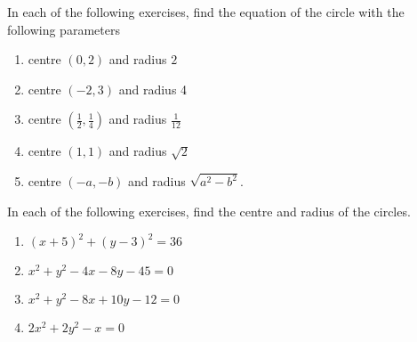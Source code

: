 In each of the following exercises, find the equation of the circle with the following parameters
\begin{enumerate}[label=\thesection.\arabic*,ref=\thesection.\theenumi]
 \item centre $(0,2)$ and radius $2$
	 \\
		\solution
\label{chapters/11/11/1/1}

%
  \item centre $(-2,3)$ and radius 4
	 \\
		\solution
\label{chapters/11/11/1/2}


  \item centre $\left(\frac{1}{2}, \frac{1}{4}\right)$ and radius $\frac{1}{12}$

  \item centre $(1,1)$ and radius $\sqrt{2}$

  \item centre $(-a,-b)$ and radius $\sqrt{a^{2}-b^{2}}$.
\end{enumerate}


In each of the following exercises,  find the centre and radius of the circles.
\begin{enumerate}[resume*]
\item  $(x+5)^{2}+(y-3)^{2}=36$ 
\item  $x^{2}+y^{2}-4 x-8 y-45=0$
\item  $x^{2}+y^{2}-8 x+10 y-12=0$ 
\item  $2 x^{2}+2 y^{2}-x=0$
\end{enumerate}

